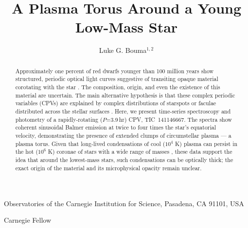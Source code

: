 \documentclass{nature3}
\title{A Plasma Torus Around a Young Low-Mass Star}
\newcommand{\carnegie}{Observatories of the Carnegie Institution for Science, Pasadena, CA 91101, USA}
\begin{document}
\author{Luke G. Bouma$^{1,2}$}

\maketitle

\scriptsize
\begin{affiliations}
\item \carnegie
\item Carnegie Fellow
\end{affiliations}
\normalsize


\begin{abstract}
\normalfont
Approximately one percent of red dwarfs younger than 100 million years
show structured, periodic optical light curves suggestive of
transiting opaque material corotating with the star
\cite{Rebull2016,Stauffer2017,Rebull2018,Bouma2024}.  The
composition, origin, and even the existence of this material are
uncertain. The main alternative hypothesis is that these complex
periodic variables (CPVs) are explained by complex distributions of
starspots or faculae distributed across the stellar surfaces
\cite{Koen2021}.  Here, we present time-series spectroscopy and
photometry of a rapidly-rotating ($P$=3.9\,hr)
CPV, TIC~141146667. The spectra show coherent sinusoidal Balmer
emission at twice to four times the star's equatorial velocity,
demonstrating the presence of extended clumps of circumstellar
plasma --- a plasma torus.  Given that long-lived condensations of
cool ($10^4$ K) plasma can persist in the hot ($10^6$ K) coronae of
stars with a wide range of masses
\cite{CollierCameron1989,Townsend2005,Dunstone2006,Petit2013,Waugh2022,Daley-Yates2024},
these data support the idea that around the lowest-mass stars, such
condensations can be optically thick; the exact origin of the
material and its microphysical opacity remain unclear.
\end{abstract}

\maketitle

\end{document}
